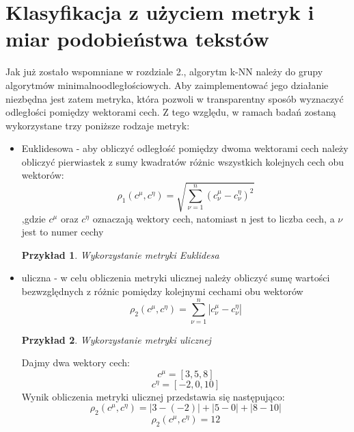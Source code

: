\documentclass{classrep}
\newtheorem{exmp}{Przykład}[section]
\begin{document}
\section{Klasyfikacja z użyciem metryk i miar podobieństwa tekstów}
 Jak już zostało wspomniane w rozdziale 2., algorytm k-NN należy do grupy algorytmów minimalnoodległościowych. Aby zaimplementować jego działanie niezbędna jest zatem metryka, która pozwoli w transparentny sposób wyznaczyć odległości pomiędzy wektorami cech. Z tego względu, w ramach badań zostaną wykorzystane trzy poniższe rodzaje metryk:
 \begin{itemize}
    \item Euklidesowa - aby obliczyć odległość pomiędzy dwoma wektorami cech należy obliczyć pierwiastek z sumy kwadratów różnic wszystkich kolejnych cech obu wektorów:
    \begin{equation}
        \rho_{1}(c^\mu, c^\eta) = \sqrt{\sum_{\nu=1}^{n}(c_{\nu}^\mu - c_{\nu}^\eta)^2}
    \end{equation}
    \indent ,gdzie $c^\mu$ oraz $c^\eta$ oznaczają wektory cech, natomiast n jest to liczba cech, a $\nu$ jest to numer cechy
    \begin{exmp} Wykorzystanie metryki Euklidesa  \\

    \end{exmp}
    \item uliczna - w celu obliczenia metryki ulicznej należy obliczyć sumę wartości bezwzględnych z różnic pomiędzy kolejnymi cechami obu wektorów
    \begin{equation}
        \rho_{2}(c^\mu, c^\eta) = \sum_{\nu=1}^{n}|c_{\nu}^\mu - c_{\nu}^\eta|
    \end{equation}
    \begin{exmp} Wykorzystanie metryki ulicznej  
    \end{exmp}
        Dajmy dwa wektory cech:
        \begin{equation}
            c^\mu = [3, 5, 8]
        \end{equation}
        \begin{equation}
            c^\eta = [-2, 0, 10]
        \end{equation}
        Wynik obliczenia metryki ulicznej przedstawia się następująco:
        \begin{equation}
            \rho_{2}(c^\mu, c^\eta) = |3 - (-2)| + |5 - 0| + |8 - 10| 
        \end{equation}
        \begin{equation}
            \rho_{2}(c^\mu, c^\eta) = 12
        \end{equation} \\
    

\end{itemize}
\end{document}
